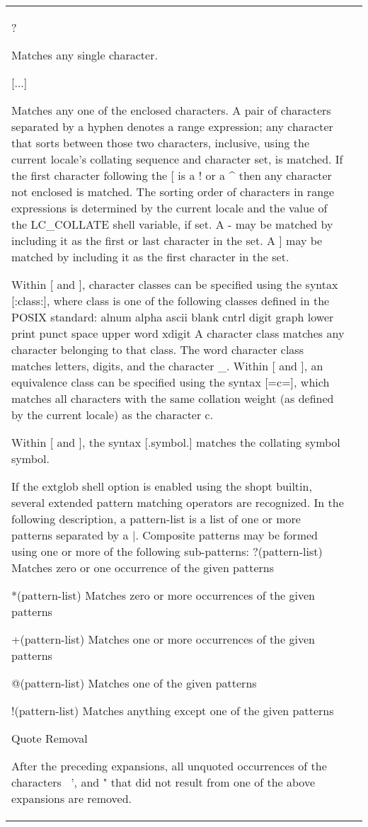 \documentclass[11pt]{article}
\begin{document}
\begin{longtable}{p{}p{}}
{{{?

Matches any single character.

[...]

Matches any one of the enclosed characters. A pair of characters separated by a hyphen denotes a range expression; any character that sorts between those two characters, inclusive, using the current locale's collating sequence and character set, is matched. If the first character following the [ is a ! or a ^ then any character not enclosed is matched. The sorting order of characters in range expressions is determined by the current locale and the value of the LC_COLLATE shell variable, if set. A - may be matched by including it as the first or last character in the set. A ] may be matched by including it as the first character in the set.

Within [ and ], character classes can be specified using the syntax [:class:], where class is one of the following classes defined in the POSIX standard:
alnum alpha ascii blank cntrl digit graph lower print punct space upper word xdigit
A character class matches any character belonging to that class. The word character class matches letters, digits, and the character _.
Within [ and ], an equivalence class can be specified using the syntax [=c=], which matches all characters with the same collation weight (as defined by the current locale) as the character c.

Within [ and ], the syntax [.symbol.] matches the collating symbol symbol.

If the extglob shell option is enabled using the shopt builtin, several extended pattern matching operators are recognized. In the following description, a pattern-list is a list of one or more patterns separated by a |. Composite patterns may be formed using one or more of the following sub-patterns:
?(pattern-list)
Matches zero or one occurrence of the given patterns

*(pattern-list)
Matches zero or more occurrences of the given patterns

+(pattern-list)
Matches one or more occurrences of the given patterns

@(pattern-list)
Matches one of the given patterns

!(pattern-list)
Matches anything except one of the given patterns

Quote Removal

After the preceding expansions, all unquoted occurrences of the characters \, ', and " that did not result from one of the above expansions are removed.
}}}
\end{longtable}
\end{document}
